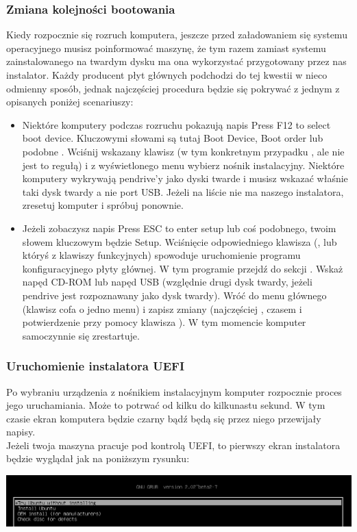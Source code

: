 \subsubsection{Zmiana kolejności bootowania}
Kiedy rozpocznie się rozruch komputera, jeszcze przed załadowaniem się systemu operacyjnego musisz poinformować maszynę, że tym razem  zamiast systemu zainstalowanego na twardym dysku ma ona wykorzystać przygotowany przez nas instalator. Każdy producent płyt głównych podchodzi do tej kwestii w nieco odmienny sposób, jednak najczęściej procedura będzie się pokrywać z jednym z opisanych poniżej scenariuszy:
\begin{itemize}
\item Niektóre komputery podczas rozruchu pokazują napis \textcolor{ubuntu_orange}{Press F12 to select boot device}. Kluczowymi słowami są tutaj \textcolor{ubuntu_orange}{Boot Device}, \textcolor{ubuntu_orange}{Boot order} lub podobne . Wciśnij wskazany klawisz (w tym konkretnym przypadku , ale nie jest to regułą) i z wyświetlonego menu wybierz nośnik instalacyjny. Niektóre komputery wykrywają pendrive'y jako dyski twarde i musisz wskazać właśnie taki dysk twardy a nie port USB. Jeżeli na liście nie ma naszego instalatora, zresetuj komputer i spróbuj ponownie.
\item Jeżeli zobaczysz napis \textcolor{ubuntu_orange}{Press ESC to enter setup} lub coś podobnego, twoim słowem kluczowym będzie \textcolor{ubuntu_orange}{Setup}. Wciśnięcie odpowiedniego klawisza (\keys{\escwin}, \keys{\delwin} lub któryś z klawiszy funkcyjnych) spowoduje uruchomienie programu konfiguracyjnego płyty głównej. W tym programie przejdź do sekcji . Wskaż napęd CD-ROM lub napęd USB (względnie drugi dysk twardy, jeżeli pendrive jest rozpoznawany jako dysk twardy). Wróć do menu głównego (klawisz \keys{\escwin} cofa o jedno menu) i zapisz zmiany (najczęściej , czasem \keys{\escwin} i potwierdzenie przy pomocy klawisza ). W tym momencie komputer samoczynnie się zrestartuje.
\end{itemize}
\subsubsection{Uruchomienie instalatora UEFI}
\label{instalacja_uruchomienie_uefi}
Po wybraniu urządzenia z nośnikiem instalacyjnym komputer rozpocznie proces jego uruchamiania. Może to potrwać od kilku do kilkunastu sekund. W tym czasie ekran komputera będzie czarny bądź będą się przez niego przewijały napisy.\\
Jeżeli twoja maszyna pracuje pod kontrolą UEFI, to pierwszy ekran instalatora będzie wyglądał jak na poniższym rysunku:
\begin{center}
        \includegraphics[width=\linewidth]{images/instalacja_UEFI_boot.png}
\end{center}

